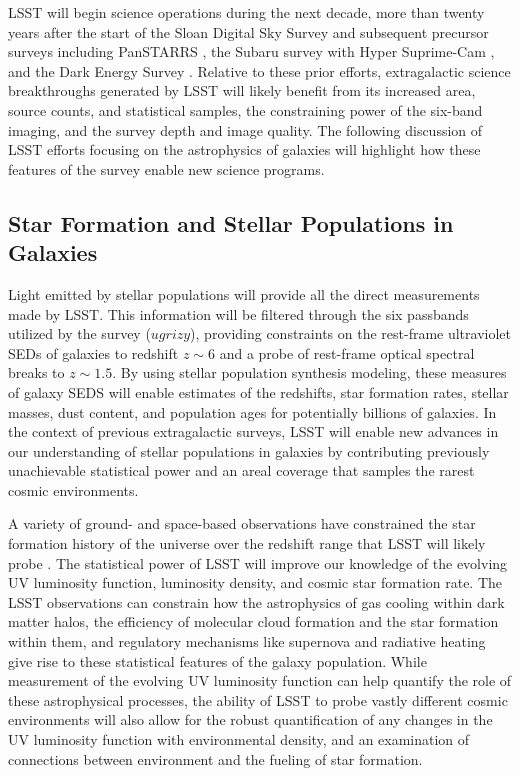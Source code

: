 LSST will begin science operations during the next decade,
more than twenty years after the start of the Sloan
Digital Sky Survey \citep{york2000a} and subsequent precursor surveys
including PanSTARRS \citep{kaiser2010a}, the Subaru
survey with Hyper Suprime-Cam \citep{miyazaki2012a}, and the Dark
Energy Survey \citep{flaugher2005a}. Relative to these prior
efforts, extragalactic science breakthroughs
generated by LSST will likely benefit from its increased area, source
counts, and statistical samples, the constraining power of the
six-band imaging, and the survey depth and image quality. The following
discussion of LSST efforts focusing on the astrophysics of galaxies
will highlight how these features of the survey enable new science
programs.



\subsection{Star Formation and Stellar Populations in Galaxies}
\label{sec:sci:gal:bkgnd:stars}

Light emitted by stellar populations will
provide all the direct measurements made by
LSST. This information will be filtered through
the six passbands utilized by the survey 
($ugrizy$), providing constraints on the
rest-frame ultraviolet SEDs of galaxies to
redshift $z\sim6$ and a probe of rest-frame
optical spectral breaks to $z\sim1.5$. By
using stellar population synthesis modeling,
these measures of galaxy SEDS will enable 
estimates of the redshifts, star formation rates,
stellar masses, dust content, and 
population ages for potentially 
billions of galaxies. In the context of previous
extragalactic surveys, LSST
will enable new advances in our understanding
of stellar populations in galaxies by contributing
previously unachievable statistical power and an
areal coverage that samples the rarest cosmic
environments.

A variety of ground- and space-based observations
have constrained the
star formation history of the universe over the
redshift range that LSST will likely probe
\citep[for a recent review, see][]{madau2014a}.
The statistical power of LSST will improve our
knowledge of the evolving UV luminosity function,
luminosity density, and cosmic
star formation rate. The LSST observations can
constrain how the astrophysics of gas
cooling within dark matter halos, the efficiency
of molecular cloud formation and the star formation
within them, and
regulatory mechanisms like supernova and radiative
heating give rise to these statistical features
of the galaxy population. While measurement of
the evolving UV luminosity function can
help quantify the role of these 
astrophysical processes, the ability of LSST
to probe vastly different cosmic environments
will also allow for the robust quantification of any
changes in the UV luminosity function with
environmental density, and an examination of 
connections between environment and the fueling
of star formation.

